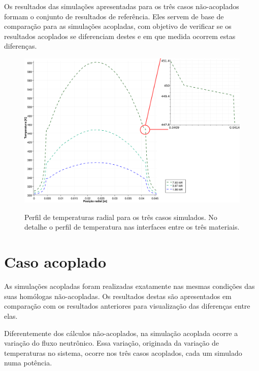 Os resultados das simulações apresentadas para os três casos não-acoplados formam o conjunto de resultados
de referência. Eles servem de base de comparação para as simulações acopladas, com objetivo de verificar
se os resultados acoplados se diferenciam destes e em que medida ocorrem estas diferenças.

\begin{figure}[htb]
  \caption[Perfil de temperaturas radial para os três casos simulados.]
          {Perfil de temperaturas radial para os três casos simulados. No detalhe o perfil de temperatura nas interfaces entre os três materiais.}
  \centering\includegraphics[scale=0.6]{figuras/T_x_NC_square_port_detalhado.png}
  \label{fig:perf-t-nac-radial}
\end{figure}


\section{Caso acoplado}
\label{sec:cp}

As simulações acopladas foram realizadas exatamente nas mesmas condições das suas homólogas não-acopladas.
Os resultados destas são apresentados em comparação com os resultados anteriores para visualização
das diferenças entre elas.

Diferentemente dos cálculos não-acoplados, na simulação acoplada ocorre a variação do fluxo neutrônico.
Essa variação, originada da variação de temperaturas no sistema, ocorre nos três casos acoplados, cada
um simulado numa potência.

